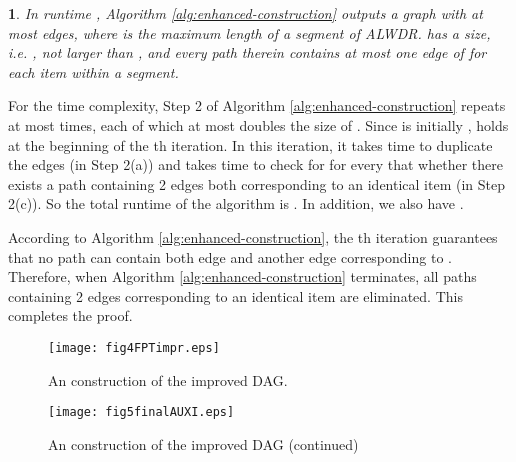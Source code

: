 \documentclass[11pt,english,onecolumn,draftcls]{IEEEtran}
\theoremstyle{plain}
\theoremstyle{plain}
\theoremstyle{plain}
\newtheorem{lem}[thm]{\protect\lemmaname}
\theoremstyle{plain}
\providecommand{\lemmaname}{Lemma}
\begin{document}
\begin{lem}
\label{lem:timeofalgf}In runtime ,
Algorithm \ref{alg:enhanced-construction} outputs a graph  with
at most  edges, where  is
the maximum length of a segment of ALWDR. 
has a size, i.e. , not larger than ,
and every path therein contains at most one edge of  for
each item  within a segment. \end{lem}
\begin{IEEEproof}
For the time complexity, Step 2 of Algorithm \ref{alg:enhanced-construction}
repeats at most  times, each of which at most doubles
the size of . Since  is initially , 
holds at the beginning of the th iteration. In this iteration,
it takes  time to duplicate the edges (in Step 2(a)) and
takes  time to check for  for every
 that whether there exists a path containing 2 edges both corresponding
to an identical item (in Step 2(c)). So the total runtime of the algorithm
is .
In addition, we also have .

According to Algorithm \ref{alg:enhanced-construction}, the th
iteration guarantees that no path can contain both edge 
and another edge corresponding to . Therefore, when Algorithm
\ref{alg:enhanced-construction} terminates, all paths containing
2 edges corresponding to an identical item are eliminated. This completes
the proof.
\end{IEEEproof}
\begin{figure}
\texttt{[image: fig4FPTimpr.eps]}

\protect\caption{\label{fig:oneoccuranceitem}An construction of the improved DAG.}
\end{figure}


\begin{figure}
\texttt{[image: fig5finalAUXI.eps]}

\protect\caption{\label{fig:oneoccuranceitem-1}An construction of the improved DAG
(continued)}
\end{figure}
\end{document}
